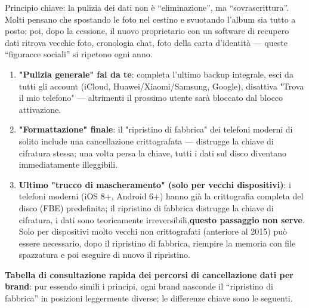 


Principio chiave: la pulizia dei dati non è “eliminazione”, ma “sovrascrittura”. Molti pensano che spostando le foto nel cestino e svuotando l'album sia tutto a posto; poi, dopo la cessione, il nuovo proprietario con un software di recupero dati ritrova vecchie foto, cronologia chat, foto della carta d'identità — queste “figuracce sociali” si ripetono ogni anno.

\begin{enumerate}
  \item \textbf{"Pulizia generale" fai da te}: completa l'ultimo backup integrale, esci da tutti gli account (iCloud, Huawei/Xiaomi/Samsung, Google), disattiva "Trova il mio telefono" — altrimenti il prossimo utente sarà bloccato dal blocco attivazione.
  \item \textbf{"Formattazione" finale}: il "ripristino di fabbrica" dei telefoni moderni di solito include una cancellazione crittografata — distrugge la chiave di cifratura stessa; una volta persa la chiave, tutti i dati sul disco diventano immediatamente illeggibili.
  \item \textbf{Ultimo "trucco di mascheramento" (solo per vecchi dispositivi)}: i telefoni moderni (iOS 8+, Android 6+) hanno già la crittografia completa del disco (FBE) predefinita; il ripristino di fabbrica distrugge la chiave di cifratura, i dati sono teoricamente irreversibili,\textbf{questo passaggio non serve}. Solo per dispositivi molto vecchi non crittografati (anteriore al 2015) può essere necessario, dopo il ripristino di fabbrica, riempire la memoria con file spazzatura e poi eseguire di nuovo il ripristino.
\end{enumerate}

\textbf{Tabella di consultazione rapida dei percorsi di cancellazione dati per brand}: pur essendo simili i principi, ogni brand nasconde il “ripristino di fabbrica” in posizioni leggermente diverse; le differenze chiave sono le seguenti.

